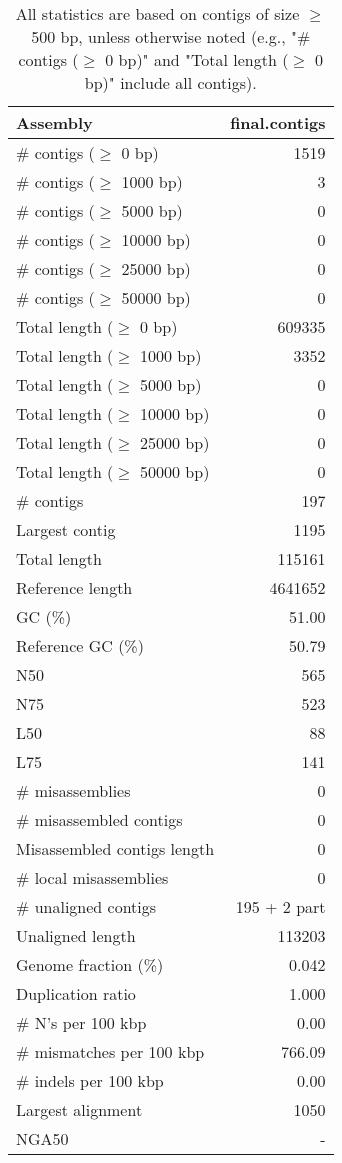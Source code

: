 \documentclass[12pt,a4paper]{article}
\begin{document}
\begin{table}[ht]
\begin{center}
\caption{All statistics are based on contigs of size $\geq$ 500 bp, unless otherwise noted (e.g., "\# contigs ($\geq$ 0 bp)" and "Total length ($\geq$ 0 bp)" include all contigs).}
\begin{tabular}{|l*{1}{|r}|}
\hline
Assembly & final.contigs \\ \hline
\# contigs ($\geq$ 0 bp) & 1519 \\ \hline
\# contigs ($\geq$ 1000 bp) & 3 \\ \hline
\# contigs ($\geq$ 5000 bp) & 0 \\ \hline
\# contigs ($\geq$ 10000 bp) & 0 \\ \hline
\# contigs ($\geq$ 25000 bp) & 0 \\ \hline
\# contigs ($\geq$ 50000 bp) & 0 \\ \hline
Total length ($\geq$ 0 bp) & 609335 \\ \hline
Total length ($\geq$ 1000 bp) & 3352 \\ \hline
Total length ($\geq$ 5000 bp) & 0 \\ \hline
Total length ($\geq$ 10000 bp) & 0 \\ \hline
Total length ($\geq$ 25000 bp) & 0 \\ \hline
Total length ($\geq$ 50000 bp) & 0 \\ \hline
\# contigs & 197 \\ \hline
Largest contig & 1195 \\ \hline
Total length & 115161 \\ \hline
Reference length & 4641652 \\ \hline
GC (\%) & 51.00 \\ \hline
Reference GC (\%) & 50.79 \\ \hline
N50 & 565 \\ \hline
N75 & 523 \\ \hline
L50 & 88 \\ \hline
L75 & 141 \\ \hline
\# misassemblies & 0 \\ \hline
\# misassembled contigs & 0 \\ \hline
Misassembled contigs length & 0 \\ \hline
\# local misassemblies & 0 \\ \hline
\# unaligned contigs & 195 + 2 part \\ \hline
Unaligned length & 113203 \\ \hline
Genome fraction (\%) & 0.042 \\ \hline
Duplication ratio & 1.000 \\ \hline
\# N's per 100 kbp & 0.00 \\ \hline
\# mismatches per 100 kbp & 766.09 \\ \hline
\# indels per 100 kbp & 0.00 \\ \hline
Largest alignment & 1050 \\ \hline
NGA50 & - \\ \hline
\end{tabular}
\end{center}
\end{table}
\end{document}

